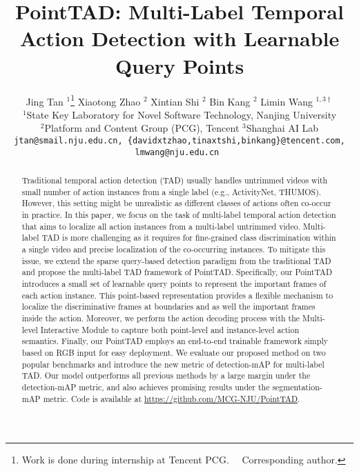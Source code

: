 \documentclass{article}
\title{PointTAD: Multi-Label Temporal Action Detection with Learnable Query Points}
\author{Jing Tan $^{1}$\thanks{Work is done during internship at Tencent PCG. ~~\textsuperscript{\dag}Corresponding author. } \quad
Xiaotong Zhao $^{2}$ \quad
Xintian Shi $^{2}$ \quad
Bin Kang $^{2}$ \quad
Limin Wang $^{1,3\dagger}$\vspace{0.2em}\\
$^{1}$State Key Laboratory for Novel Software Technology, Nanjing University \\ $^{2}$Platform and Content Group (PCG), Tencent \quad \quad $^{3}$Shanghai AI Lab \vspace{.2em}\\
{\tt\small{jtan@smail.nju.edu.cn,  \{davidxtzhao,tinaxtshi,binkang\}@tencent.com, lmwang@nju.edu.cn }}
}
\begin{document}
\maketitle


\begin{abstract}
  Traditional temporal action detection (TAD) usually handles untrimmed videos with small number of action instances from a single label (e.g., ActivityNet, THUMOS). However, this setting might be unrealistic as different classes of actions often co-occur in practice. 
  In this paper, we focus on the task of multi-label temporal action detection that aims to localize all action instances from a multi-label untrimmed video. 
  Multi-label TAD is more challenging as it requires for fine-grained class discrimination within a single video and precise localization of the co-occurring instances. 
  To mitigate this issue, we extend the sparse query-based detection paradigm from the traditional TAD and propose the multi-label TAD framework of PointTAD. 
  Specifically, our PointTAD introduces a small set of learnable query points to represent the important frames of each action instance. This point-based representation provides a flexible mechanism to localize the discriminative frames at boundaries and as well the important frames inside the action.
  Moreover, we perform the action decoding process with the Multi-level Interactive Module to capture both point-level and instance-level action semantics. Finally, our PointTAD employs an end-to-end trainable framework simply based on RGB input for easy deployment. We evaluate our proposed method on two popular benchmarks and introduce the new metric of detection-mAP for multi-label TAD. Our model outperforms all previous methods by a large margin under the detection-mAP metric, and also achieves promising results under the segmentation-mAP metric.
  Code is available at \href{https://github.com/MCG-NJU/PointTAD}{https://github.com/MCG-NJU/PointTAD}.
\end{abstract}
\end{document}
